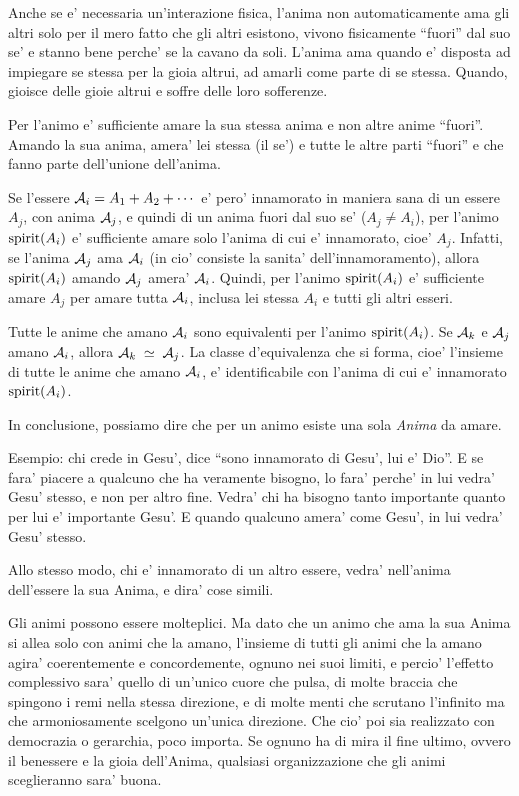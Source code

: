 Anche se e' necessaria un'interazione fisica, l'anima non automaticamente ama gli altri solo per il mero fatto che gli altri esistono, vivono fisicamente ``fuori'' dal suo se' e stanno bene perche' se la cavano da soli. L'anima ama quando e' disposta ad impiegare se stessa per la gioia altrui, ad amarli come parte di se stessa. Quando, gioisce delle gioie altrui e soffre delle loro sofferenze. 

Per l'animo e' sufficiente amare la sua stessa anima e non altre anime ``fuori''. Amando la sua anima, amera' lei stessa (il se') e tutte le altre parti ``fuori'' e che fanno parte dell'unione dell'anima.

Se l'essere $\mathcal{A}_i=A_1+A_2+\cdots$ e' pero' innamorato in maniera sana di un essere $A_j$, con anima $\mathcal{A}_j$, e quindi di un anima fuori dal suo se' ($A_j\ne A_i$), per l'animo $\textrm{spirit}(A_i)$ e' sufficiente amare solo l'anima di cui e' innamorato, cioe' $A_j$. Infatti, se l'anima $\mathcal{A}_j$ ama $\mathcal{A}_i$ (in cio' consiste la sanita' dell'innamoramento), allora $\textrm{spirit}(A_i)$ amando $\mathcal{A}_j$ amera' $\mathcal{A}_i$.
Quindi, per l'animo $\textrm{spirit}(A_i)$ e' sufficiente amare $A_j$ per amare tutta $\mathcal{A}_i$, inclusa lei stessa $A_i$ e tutti gli altri esseri.

Tutte le anime che amano $\mathcal{A}_i$ sono equivalenti per l'animo $\textrm{spirit}(A_i)$. Se $\mathcal{A}_k$ e $\mathcal{A}_j$ amano $\mathcal{A}_i$, allora ${\mathcal{A}_k\;\simeq\;\mathcal{A}_j}$. La classe d'equivalenza che si forma, cioe' l'insieme di tutte le anime che amano $\mathcal{A}_i$, e' identificabile con l'anima di cui e' innamorato $\textrm{spirit}(A_i)$.

In conclusione, possiamo dire che per un animo esiste una sola \emph{Anima} da amare.

Esempio: chi crede in Gesu', dice ``sono innamorato di Gesu', lui e' Dio''. E se fara' piacere a qualcuno che ha veramente bisogno, lo fara' perche' in lui vedra' Gesu' stesso, e non per altro fine. Vedra' chi ha bisogno tanto importante quanto per lui e' importante Gesu'. E quando qualcuno amera' come Gesu', in lui vedra' Gesu' stesso.

Allo stesso modo, chi e' innamorato di un altro essere, vedra' nell'anima dell'essere la sua Anima, e dira' cose simili.

Gli animi possono essere molteplici. Ma dato che un animo che ama la sua Anima si allea solo con animi che la amano, l'insieme di tutti gli animi che la amano agira' coerentemente e concordemente, ognuno nei suoi limiti, e percio' l'effetto complessivo sara' quello di un'unico cuore che pulsa, di molte braccia che spingono i remi nella stessa direzione, e di molte menti che scrutano l'infinito ma che armoniosamente scelgono un'unica direzione. Che cio' poi sia realizzato con democrazia o gerarchia, poco importa. Se ognuno ha di mira il fine ultimo, ovvero il benessere e la gioia dell'Anima, qualsiasi organizzazione che gli animi sceglieranno sara' buona.


